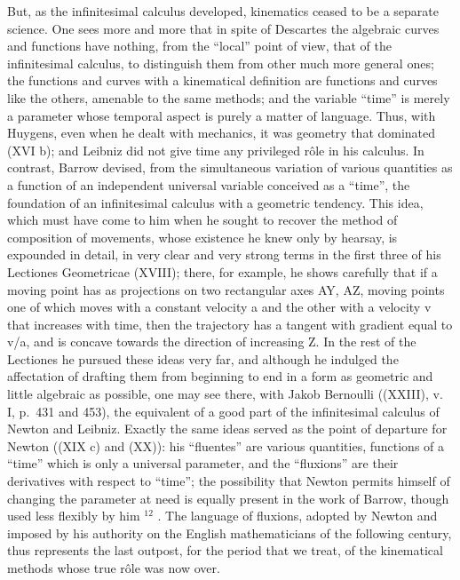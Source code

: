 But, as the infinitesimal calculus developed, kinematics ceased to be a separate science. One sees more and more that in spite of Descartes the algebraic curves and functions have nothing, from the ``local'' point of view, that of the infinitesimal calculus, to distinguish them from other much more general ones; the functions and curves with a kinematical definition are functions and curves like the others, amenable to the same methods; and the variable ``time'' is merely a parameter whose temporal aspect is purely a matter of language. Thus, with Huygens, even when he dealt with mechanics, it was geometry that dominated (XVI b); and Leibniz did not give time any privileged rôle in his calculus. In contrast, Barrow devised, from the simultaneous variation of various quantities as a function of an independent universal variable conceived as a ``time'', the foundation of an infinitesimal calculus with a geometric tendency. This idea, which must have come to him when he sought to recover the method of composition of movements, whose existence he knew only by hearsay, is expounded in detail, in very clear and very strong terms in the first three of his Lectiones Geometricae (XVIII); there, for example, he shows carefully that if a moving point has as projections on two rectangular axes AY, AZ, moving points one of which moves with a constant velocity a and the other with a velocity v that increases with time, then the trajectory has a tangent with gradient equal to v/a, and is concave towards the direction of increasing Z. In the rest of the Lectiones he pursued these ideas very far, and although he indulged the affectation of drafting them from beginning to end in a form as geometric and little algebraic as possible, one may see there, with Jakob Bernoulli ((XXIII), v. I, p.~431 and 453), the equivalent of a good part of the infinitesimal calculus of Newton and Leibniz. Exactly the same ideas served as the point of departure for Newton ((XIX c) and (XX)): his ``fluentes'' are various quantities, functions of a ``time'' which is only a universal parameter, and the ``fluxions'' are their derivatives with respect to ``time''; the possibility that Newton permits himself of changing the parameter at need is equally present in the work of Barrow, though used less flexibly by him \(^{12}\) . The language of fluxions, adopted by Newton and imposed by his authority on the English mathematicians of the following century, thus represents the last outpost, for the period that we treat, of the kinematical methods whose true rôle was now over.

